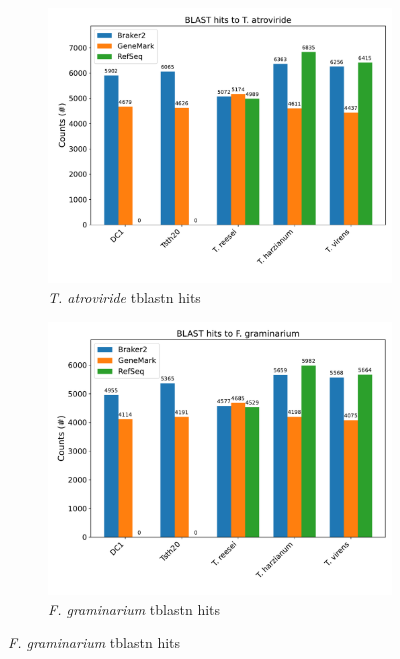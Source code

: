 \begin{figure}[htp]
  \centering
  \begin{subfigure}[b]{0.75\textwidth}
    \includegraphics[width=\textwidth]{figures/blast-tatroviride.pdf}
    \caption{\textit{T. atroviride} tblastn hits}
    \label{fig:blast-tatroviride}
  \end{subfigure}
  \par\medskip
  \begin{subfigure}[b]{0.75\textwidth}
    \includegraphics[width=\textwidth]{figures/blast-fgraminarium.pdf}
    \caption{\textit{F. graminarium} tblastn hits}
    \label{fig:blast-fgraminarium}
  \end{subfigure}
\end{figure}

